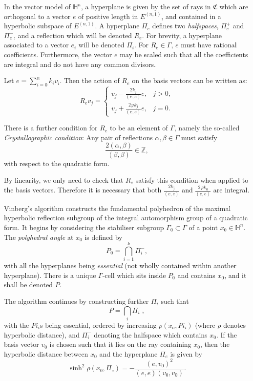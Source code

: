 \documentclass[smallcondensed]{svjour3}                     %
\begin{document}
In the vector model of $\mathbb{H}^n$, a hyperplane is given by the set of rays in $\mathfrak{C}$ which are orthogonal to a vector $e$ of positive length in $E^{(n,1)}$, and contained in a hyperbolic subspace of $E^{(n,1)}$. A hyperplane $\Pi_e$ defines two \emph{halfspaces}, $\Pi_e^+$ and $\Pi_e^-$, and a reflection which will be denoted $R_e$. For brevity, a hyperplane associated to a vector $e_i$ will be denoted $\Pi_i$. For $R_e \in \Gamma$, $e$ must have rational coefficients. Furthermore, the vector $e$ may be scaled such that all the coefficients are integral and do not have any common divisors. 

Let $e= \sum_{i=0}^nk_iv_i$. Then the action of $R_e$ on the basis vectors can be written as:
\begin{equation}\label{reflects}
  R_e v_j = \left\{
  \begin{array}{lr}
    v_j - \frac{2 k_j}{(e, e)}e, &  j > 0,\\
    v_j + \frac{2 \varphi k_j}{(e, e)}e, &  j = 0.
   \end{array}\right.
\end{equation}

There is a further condition for $R_e$ to be an element of $\Gamma$, namely the so-called \emph{Crystallographic condition}: Any pair of reflections $\alpha, \beta \in \Gamma$ must satisfy
\begin{equation}\label{crystcondition}
\frac{2(\alpha, \beta)}{(\beta, \beta)} \in \mathbb{Z}, 
\end{equation}
with respect to the quadratic form.

By linearity, we only need to check that $R_e$ satisfy this condition when applied to the basis vectors. Therefore it is necessary that both $\frac{2 k_j}{(e, e)}$ and $\frac{2 \varphi k_0}{(e, e)}$ are integral.

Vinberg's algorithm constructs the fundamental polyhedron of the maximal hyperbolic reflection subgroup of the integral automorphism group of a quadratic form. It begins by considering the stabiliser subgroup $\Gamma_0 \subset \Gamma$ of a point $x_0 \in \mathbb{H}^n$. The \emph{polyhedral angle} at $x_0$ is defined by
\[P_0 = \bigcap_{i=1}^k \Pi_i^-,\]
with all the hyperplanes being \emph{essential} (not wholly contained within another hyperplane). There is a unique $\Gamma$-cell which sits inside $P_0$ and contains $x_0$, and it shall be denoted $P$.

The algorithm continues by constructing further $\Pi_i$ such that 
\[P = \bigcap_{i} \Pi_i^-,\]
with the $Pi_i$s being essential, ordered by increasing $\rho (x_o, Pi_i)$ (where $\rho$ denotes hyperbolic distance), and $\Pi_i^-$ denoting the halfspace which contains $x_0$. If the basis vector $v_0$ is chosen such that it lies on the ray containing $x_0$, then the hyperbolic distance between $x_0$ and the hyperplane $\Pi_e$ is given by
\begin{equation}\label{rhox0pie}
\sinh^2\rho(x_0,\Pi_e) = -\frac{(e,v_0)^2}{(e,e)(v_0,v_0)}.
\end{equation}
\end{document}
